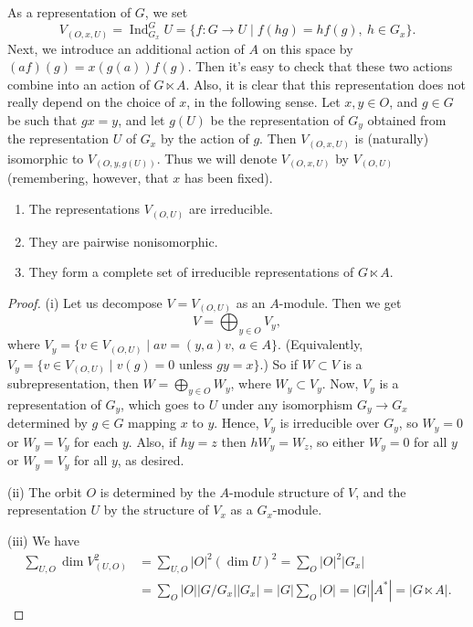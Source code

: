 As a representation of $G$, we set
\[
V_{(O,x,U)}=\operatorname{Ind}_{G_x}^G U
=\{f:G\to U\mid f(hg)=hf(g),\ h\in G_x\}.
\]
Next, we introduce an additional action of $A$ on this space by $(af)(g)=x(g(a))f(g)$. Then it's easy to check that these two actions combine into an action of $G\ltimes A$. Also, it is clear that this representation does not really depend on the choice of $x$, in the following sense. Let $x,y\in O$, and $g\in G$ be such that $gx=y$, and let $g(U)$ be the representation of $G_y$ obtained from the representation $U$ of $G_x$ by the action of $g$. Then $V_{(O,x,U)}$ is (naturally) isomorphic to $V_{(O,y,g(U))}$. Thus we will denote $V_{(O,x,U)}$ by $V_{(O,U)}$ (remembering, however, that $x$ has been fixed).
\begin{theorem}
\begin{enumerate}[label=(\roman*)]
\item The representations $V_{(O,U)}$ are irreducible.
\item They are pairwise nonisomorphic.
\item They form a complete set of irreducible representations of $G\ltimes A$.
\end{enumerate}
\end{theorem}
\begin{proof}
(i) Let us decompose $V=V_{(O,U)}$ as an $A$-module. Then we get
\[
V=\bigoplus_{y\in O}V_y,
\]
where $V_y=\{v\in V_{(O,U)}\mid av=(y,a)v,\ a\in A\}$. (Equivalently, $V_y=\{v\in V_{(O,U)}\mid v(g)=0\text{ unless }gy=x\}$.) So if $W\subset V$ is a subrepresentation, then $W=\bigoplus_{y\in O}W_y$, where $W_y\subset V_y$. Now, $V_y$ is a representation of $G_y$, which goes to $U$ under any isomorphism $G_y\to G_x$ determined by $g\in G$ mapping $x$ to $y$. Hence, $V_y$ is irreducible over $G_y$, so $W_y=0$ or $W_y=V_y$ for each $y$. Also, if $hy=z$ then $hW_y=W_z$, so either $W_y=0$ for all $y$ or $W_y=V_y$ for all $y$, as desired.

(ii) The orbit $O$ is determined by the $A$-module structure of $V$, and the representation $U$ by the structure of $V_x$ as a $G_x$-module.

(iii) We have
\[
\begin{aligned}
\sum_{U,O}\dim V_{(U,O)}^2
&=\sum_{U,O}|O|^2(\dim U)^2
 =\sum_O|O|^2|G_x|\\
&=\sum_O|O||G/G_x||G_x|
 =|G|\sum_O|O|=|G||A^*|=|G\ltimes A|.
\end{aligned}
\]
\end{proof}
